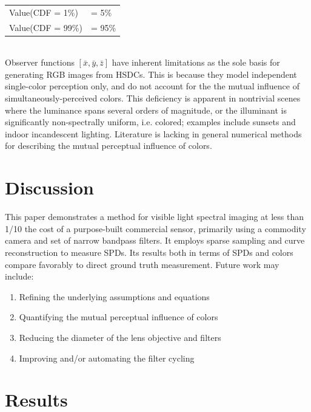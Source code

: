 \documentclass[twocolumn,10pt]{asme2ej}
\begin{document}
\begin{tabular}{l l}
Value(CDF = 1\%) & = 5\%\\
Value(CDF = 99\%) & = 95\%\\
\end{tabular}\\

Observer functions $[ \bar{x}, \bar{y}, \bar{z} ]$ have inherent limitations as the sole basis for generating RGB images from HSDCs. This is because they model independent single-color perception only, and do not account for the the mutual influence of simultaneously-perceived colors. This deficiency is apparent in nontrivial scenes where the luminance spans several orders of magnitude, or the illuminant is significantly non-spectrally uniform, i.e. colored; examples include sunsets and indoor incandescent lighting. Literature is lacking in general numerical methods for describing the mutual perceptual influence of colors.

\section{Discussion}

This paper demonstrates a method for visible light spectral imaging at less than 1/10 the cost of a purpose-built commercial sensor, primarily using a commodity camera and set of narrow bandpass filters. It employs sparse sampling and curve reconstruction to measure SPDs. Its results both in terms of SPDs and colors compare favorably to direct ground truth measurement. Future work may include:

\begin{enumerate}
\item Refining the underlying assumptions and equations
\item Quantifying the mutual perceptual influence of colors
\item Reducing the diameter of the lens objective and filters 
\item Improving and/or automating the filter cycling
\end{enumerate}

\clearpage

\onecolumn

\section{Results}
\end{document}
